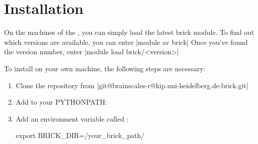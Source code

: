 \section{Installation}
\label{sec:install}

On the machines of the , you can simply load the latest brick
module. To find out which versions are available, you can enter
|module av brick|
Once you've found the version number, enter
|module load brick/<version>|

To install  on your own machine, the following steps are necessary:
\begin{enumerate}
	\item Clone the repository from
		|git@brainscales-r@kip.uni-heidelberg.de:brick.git|
	\item Add to your PYTHONPATH:
	\item Add an environment variable called :
		\begin{lstbashplain}
export BRICK_DIR=/your_brick_path/
		\end{lstbashplain}
\end{enumerate}


